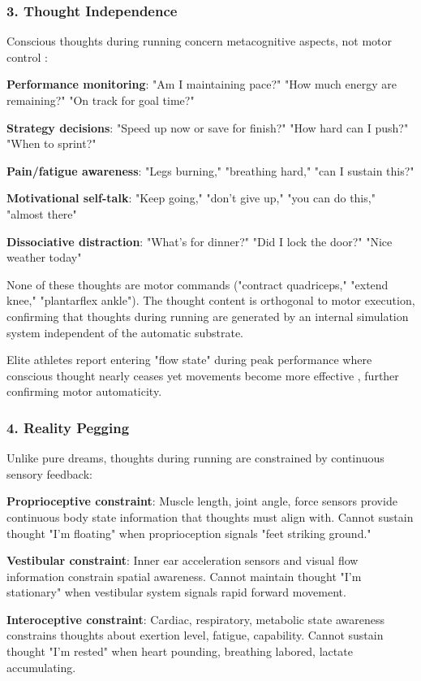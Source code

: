 \documentclass[11pt,onecolumn]{article}
\begin{document}
\subsubsection{3. Thought Independence}

Conscious thoughts during running concern metacognitive aspects, not motor control \citep{brick2014thinking}:

\textbf{Performance monitoring}: "Am I maintaining pace?" "How much energy are remaining?" "On track for goal time?"

\textbf{Strategy decisions}: "Speed up now or save for finish?" "How hard can I push?" "When to sprint?"

\textbf{Pain/fatigue awareness}: "Legs burning," "breathing hard," "can I sustain this?"

\textbf{Motivational self-talk}: "Keep going," "don't give up," "you can do this," "almost there"

\textbf{Dissociative distraction}: "What's for dinner?" "Did I lock the door?" "Nice weather today"

None of these thoughts are motor commands ("contract quadriceps," "extend knee," "plantarflex ankle"). The thought content is orthogonal to motor execution, confirming that thoughts during running are generated by an internal simulation system independent of the automatic substrate.

Elite athletes report entering "flow state" during peak performance where conscious thought nearly ceases yet movements become more effective \citep{jackson1995factors}, further confirming motor automaticity.

\subsubsection{4. Reality Pegging}

Unlike pure dreams, thoughts during running are constrained by continuous sensory feedback:

\textbf{Proprioceptive constraint}: Muscle length, joint angle, force sensors provide continuous body state information that thoughts must align with. Cannot sustain thought "I'm floating" when proprioception signals "feet striking ground."

\textbf{Vestibular constraint}: Inner ear acceleration sensors and visual flow information constrain spatial awareness. Cannot maintain thought "I'm stationary" when vestibular system signals rapid forward movement.

\textbf{Interoceptive constraint}: Cardiac, respiratory, metabolic state awareness constrains thoughts about exertion level, fatigue, capability. Cannot sustain thought "I'm rested" when heart pounding, breathing labored, lactate accumulating.
\end{document}
